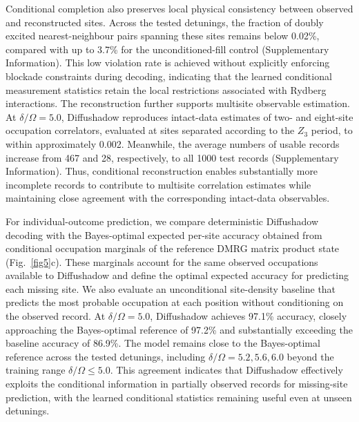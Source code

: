 \documentclass[pdflatex,sn-nature]{sn-jnl}%
\theoremstyle{thmstyleone}%
\theoremstyle{thmstyletwo}%
\theoremstyle{thmstylethree}%
\begin{document}
Conditional completion also preserves local physical consistency between observed and reconstructed sites. Across the tested detunings, the fraction of doubly excited nearest-neighbour pairs spanning these sites remains below 0.02\%, compared with up to 3.7\% for the unconditioned-fill control (Supplementary Information). This low violation rate is achieved without explicitly enforcing blockade constraints during decoding, indicating that the learned conditional measurement statistics retain the local restrictions associated with Rydberg interactions. The reconstruction further supports multisite observable estimation. At $\delta/\Omega=5.0$, Diffushadow reproduces intact-data estimates of two- and eight-site occupation correlators, evaluated at sites separated according to the $Z_3$ period, to within approximately 0.002. Meanwhile, the average numbers of usable records increase from 467 and 28, respectively, to all 1000 test records (Supplementary Information). Thus, conditional reconstruction enables substantially more incomplete records to contribute to multisite correlation estimates while maintaining close agreement with the corresponding intact-data observables.

For individual-outcome prediction, we compare deterministic Diffushadow decoding with the Bayes-optimal expected per-site accuracy obtained from conditional occupation marginals of the reference DMRG matrix product state (Fig.~\ref{fig5}c). These marginals account for the same observed occupations available to Diffushadow and define the optimal expected accuracy for predicting each missing site. We also evaluate an unconditional site-density baseline that predicts the most probable occupation at each position without conditioning on the observed record. At $\delta/\Omega=5.0$, Diffushadow achieves 97.1\% accuracy, closely approaching the Bayes-optimal reference of 97.2\% and substantially exceeding the baseline accuracy of 86.9\%. The model remains close to the Bayes-optimal reference across the tested detunings, including $\delta/\Omega=5.2,5.6,6.0$ beyond the training range $\delta/\Omega\leq5.0$. This agreement indicates that Diffushadow effectively exploits the conditional information in partially observed records for missing-site prediction, with the learned conditional statistics remaining useful even at unseen detunings.


\end{document}
